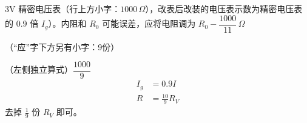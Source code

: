 \begin{problem}[2]
3V 精密电压表{\scriptsize（行上方小字：$1000\,\Omega$）}，改表后改装的电压表示数为精密电压表的 0.9 倍 $I_g$）。内阻和 $R_0$ 可能误差，应将电阻调为 $R_0-\dfrac{1000}{11}\,\Omega$ %

（“应”字下方另有小字：9份）


\begin{solution}
（左侧独立算式）$\dfrac{1000}{9}$
\begin{align*}
I_g&=0.9I\\
R&=\frac{10}{9}R_V
\end{align*}
去掉 $\frac{1}{9}$ 份 $R_V$ 即可。
\end{solution}
\end{problem}

